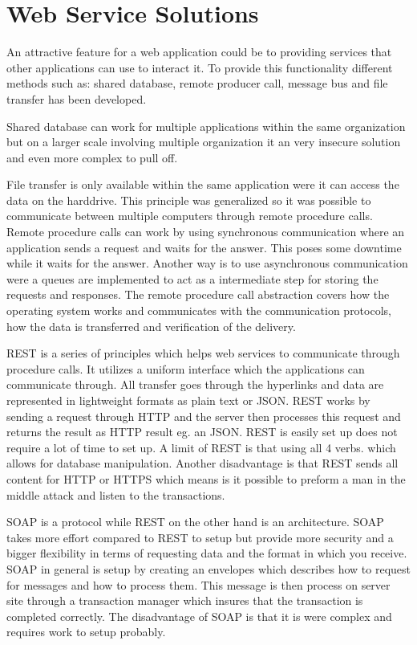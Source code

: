 \section{Web Service Solutions}
An attractive feature for a web application could be to providing services that other applications can use to interact it. To provide this functionality different methods such as: shared database, remote producer call, message bus and file transfer has been developed.

Shared database can work for multiple applications within the same organization but on a larger scale involving multiple organization it an very insecure solution and even more complex to pull off.

File transfer is only available within the same application were it can access the data on the harddrive. This principle was generalized so it was possible to communicate between multiple computers through remote procedure calls. Remote procedure calls can work by using synchronous communication where an application sends a request and waits for the answer. This poses some downtime while it waits for the answer. Another way is to use asynchronous communication were a queues are implemented to act as a intermediate step for storing the requests and responses.
The remote procedure call abstraction covers how the operating system works and communicates with the communication protocols, how the data is transferred and verification of the delivery.

REST is a series of principles which helps web services to communicate through procedure calls. It utilizes a uniform interface which the applications can communicate through. All transfer goes through the hyperlinks and data are represented in lightweight formats as plain text or JSON. REST works by sending a request through HTTP and the server then processes this request and returns the result as HTTP result eg. an JSON. REST is easily set up does not require a lot of time to set up. A limit of REST is that using all 4 verbs. which allows for database manipulation. Another disadvantage is that REST sends all content for HTTP or HTTPS which means is it possible to preform a man in the middle attack and listen to the transactions.

SOAP is a protocol while REST on the other hand is an architecture. SOAP takes more effort compared to REST to setup but provide more security and a bigger flexibility in terms of requesting data and the format in which you receive. SOAP in general is setup by creating an envelopes which describes how to request for messages and how to process them. This message is then process on server site through a transaction manager which insures that the transaction is completed correctly. The disadvantage of SOAP is that it is were complex and requires work to setup probably.